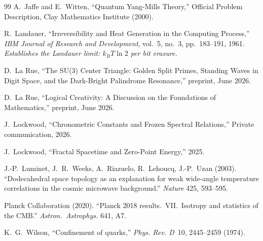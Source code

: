 \begin{thebibliography}{99}
A.~Jaffe and E.~Witten,
``Quantum Yang-Mills Theory,''
Official Problem Description, Clay Mathematics Institute (2000).

R.~Landauer,
``Irreversibility and Heat Generation in the Computing Process,''
\emph{IBM Journal of Research and Development}, vol.~5, no.~3, pp.~183--191, 1961.
\textit{Establishes the Landauer limit: $k_B T \ln 2$ per bit erasure.}

D.~La Rue, ``The SU(3) Center Triangle: Golden Split Primes, Standing Waves in Digit Space, and the Dark-Bright Palindrome Resonance,'' preprint, June 2026.

D.~La Rue, ``Logical Creativity: A Discussion on the Foundations of Mathematics,'' preprint, June 2026.

J.~Lockwood,
``Chronometric Constants and Frozen Spectral Relations,''
Private communication, 2026.

J.~Lockwood,
``Fractal Spacetime and Zero-Point Energy,'' 2025.

J.-P.~Luminet, J.~R.~Weeks, A.~Riazuelo, R.~Lehoucq, J.-P.~Uzan (2003).
``Dodecahedral space topology as an explanation for weak wide-angle temperature correlations in the cosmic microwave background.''
\textit{Nature} 425, 593--595.

Planck Collaboration (2020).
``Planck 2018 results.\ VII.\ Isotropy and statistics of the CMB.''
\textit{Astron.\ Astrophys.} 641, A7.

K.~G.~Wilson,
``Confinement of quarks,''
\emph{Phys. Rev. D}\ 10, 2445--2459 (1974).



\end{thebibliography}

